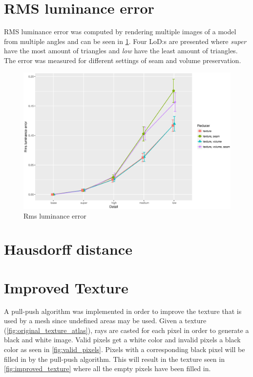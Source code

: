 \section{RMS luminance error}
RMS luminance error was computed by rendering multiple images of a model from multiple angles and can be seen in \cref{fig:mean_luminance_error}. Four LoD:s are presented where \emph{super} have the most amount of triangles and \emph{low} have the least amount of triangles. The error was measured for different settings of seam and volume preservation.

\begin{figure}[h]
  \centering
  \includegraphics[width=\textwidth]{figures/Rdata/rms_luminance.eps}
  \caption{Rms luminance error}
  \label{fig:mean_luminance_error}
\end{figure}

\section{Hausdorff distance}

\section{Improved Texture}
A pull-push algorithm was implemented in order to improve the texture that is used by a mesh since undefined areas may be used. Given a texture (\cref{fig:original_texture_atlas}), rays are casted for each pixel in order to generate a black and white image. Valid pixels get a white color and invalid pixels a black color as seen in \cref{fig:valid_pixels}. Pixels with a corresponding black pixel will be filled in by the pull-push algorithm. This will result in the texture seen in \cref{fig:improved_texture} where all the empty pixels have been filled in.

